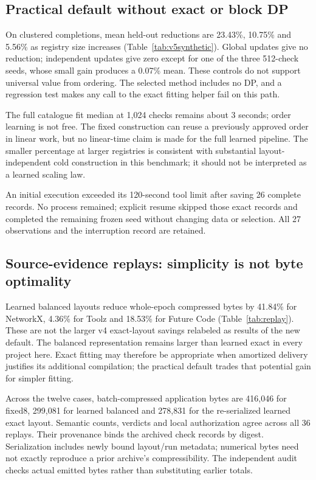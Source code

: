 \subsection{Practical default without exact or block DP}\label{sec:practical}
On clustered completions, mean held-out reductions are 23.43\%, 10.75\% and
5.56\% as registry size increases (Table~\ref{tab:v5synthetic}). Global updates
give no reduction; independent updates give zero except for one of the three
512-check seeds, whose small gain produces a 0.07\% mean. These controls do not
support universal value from ordering. The selected method includes no DP, and a
regression test makes any call to the exact fitting helper fail on this path.

The full catalogue fit median at 1{,}024 checks remains about 3 seconds; order
learning is not free. The fixed construction can reuse a previously approved
order in linear work, but no linear-time claim is made for the full learned
pipeline. The smaller percentage at larger registries is consistent with
substantial layout-independent cold construction in this benchmark; it should not
be interpreted as a learned scaling law.

An initial execution exceeded its 120-second tool limit after saving 26 complete
records. No process remained; explicit resume skipped those exact records and
completed the remaining frozen seed without changing data or selection. All 27
observations and the interruption record are retained.

\subsection{Source-evidence replays: simplicity is not byte optimality}\label{sec:replays}
Learned balanced layouts reduce whole-epoch compressed bytes by 41.84\% for
NetworkX, 4.36\% for Toolz and 18.53\% for Future Code (Table~\ref{tab:replay}).
These are not the larger v4 exact-layout savings relabeled as results of the new
default. The balanced representation remains larger than learned exact in every
project here. Exact fitting may therefore be appropriate when amortized delivery
justifies its additional compilation; the practical default trades that potential
gain for simpler fitting.

Across the twelve cases, batch-compressed application bytes are 416{,}046 for
fixed8, 299{,}081 for learned balanced and 278{,}831 for the re-serialized
learned exact layout. Semantic counts, verdicts and local authorization agree
across all 36 replays. Their provenance binds the archived check records by
digest. Serialization includes newly bound layout/run metadata; numerical bytes
need not exactly reproduce a prior archive's compressibility. The independent
audit checks actual emitted bytes rather than substituting earlier totals.

